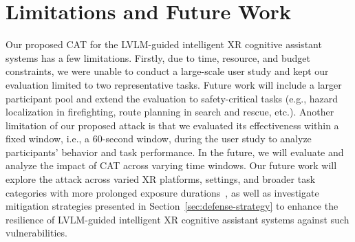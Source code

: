 \documentclass[sigconf,review,anonymous]{acmart}
\begin{document}
\section{Limitations and Future Work}
Our proposed CAT for the LVLM-guided intelligent XR cognitive assistant systems has a few limitations. Firstly, due to time, resource, and budget constraints, we were unable to conduct a large-scale user study and kept our evaluation limited to two representative tasks. Future work will include a larger participant pool and extend the evaluation to safety-critical tasks (e.g., hazard localization in firefighting, route planning in search and rescue, etc.). Another limitation of our proposed attack is that we evaluated its effectiveness within a fixed window, i.e., a 60-second window, during the user study to analyze participants' behavior and task performance. In the future, we will evaluate and analyze the impact of CAT across varying time windows. Our future work will explore the attack across varied XR platforms, settings, and broader task categories with more prolonged exposure durations~\cite{srinidhi2024xair, behravan2025generative, qu2024looking}, as well as investigate mitigation strategies presented in Section~\ref{sec:defense-strategy} to enhance the resilience of LVLM-guided intelligent XR cognitive assistant systems against such vulnerabilities.

\end{document}
